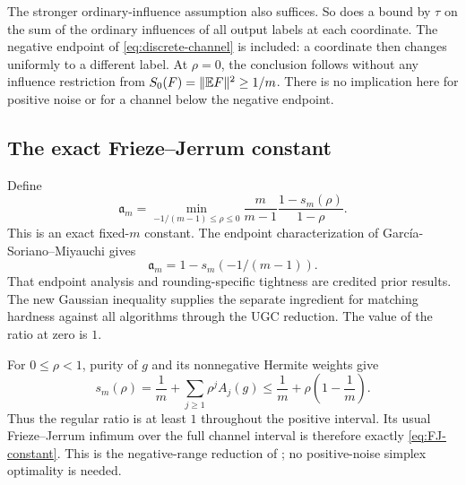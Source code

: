 The stronger ordinary-influence assumption also suffices. So does a
bound by $\tau$ on the sum of the ordinary influences of all output
labels at each coordinate. The negative endpoint of
\eqref{eq:discrete-channel} is included: a coordinate then changes
uniformly to a different label. At $\rho=0$, the conclusion follows
without any influence restriction from $S_0(F)=\lVert \mathbb E F\rVert^2\ge1/m$.
There is no implication here for positive noise or for a channel below
the negative endpoint.

\subsection{The exact Frieze--Jerrum constant}
Define
\begin{equation}\label{eq:FJ-constant}
 \mathfrak a_m=\min_{-1/(m-1)\le\rho\le0}
       \frac{m}{m-1}\frac{1-s_m(\rho)}{1-\rho}.
\end{equation}
This is an exact fixed-$m$ constant. The endpoint characterization of
Garc\'ia-Soriano--Miyauchi \cite[Theorems 4.8--4.9]{GSM} gives
\begin{equation}\label{eq:FJ-endpoint}
       \mathfrak a_m=1-s_m(-1/(m-1)).
\end{equation}
That endpoint analysis and rounding-specific tightness are credited prior
results. The new Gaussian inequality supplies the separate ingredient for
matching hardness against all algorithms through the UGC reduction. The
value of the ratio at zero is $1$.

For $0\le\rho<1$, purity of $g$ and its nonnegative Hermite weights give
\[
 s_m(\rho)=\frac1m+\sum_{j\ge1}\rho^j A_j(g)
      \le\frac1m+\rho\left(1-\frac1m\right).
\]
Thus the regular ratio is at least $1$ throughout the positive interval.
Its usual Frieze--Jerrum infimum over the full channel interval is
therefore exactly \eqref{eq:FJ-constant}. This is the negative-range
reduction of \cite[Lemma~A.4]{IM}; no positive-noise simplex optimality
is needed.

